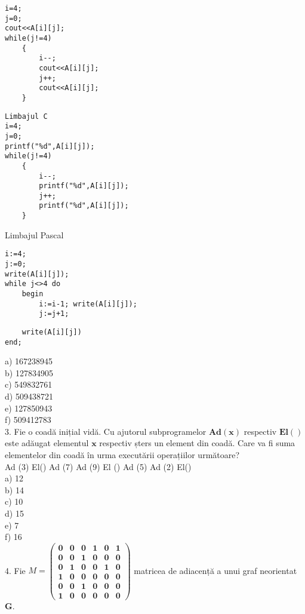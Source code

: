 \begin{verbatim}
i=4;
j=0;
cout<<A[i][j];
while(j!=4)
    {
        i--;
        cout<<A[i][j];
        j++;
        cout<<A[i][j];
    }
\end{verbatim}

\begin{verbatim}
Limbajul C
i=4;
j=0;
printf("%d",A[i][j]);
while(j!=4)
    {
        i--;
        printf("%d",A[i][j]);
        j++;
        printf("%d",A[i][j]);
    }
\end{verbatim}

Limbajul Pascal

\begin{verbatim}
i:=4;
j:=0;
write(A[i][j]);
while j<>4 do
    begin
        i:=i-1; write(A[i][j]);
        j:=j+1;
\end{verbatim}

\begin{verbatim}
    write(A[i][j])
end;
\end{verbatim}

a) 167238945\\
b) 127834905\\
c) 549832761\\
d) 509438721\\
e) 127850943\\
f) 509412783\\
3. Fie o coadă inițial vidă. Cu ajutorul subprogramelor $\mathbf{A d}(\mathbf{x})$ respectiv $\mathbf{E l}()$ este adăugat elementul $\mathbf{x}$ respectiv șters un element din coadă. Care va fi suma elementelor din coadă în urma executării operațiilor următoare?\\
Ad (3) El() Ad (7) Ad (9) El () Ad (5) Ad (2) El()\\
a) 12\\
b) 14\\
c) 10\\
d) 15\\
e) 7\\
f) 16\\
4. Fie $M=\left(\begin{array}{llllll}\mathbf{0} & \mathbf{0} & \mathbf{0} & \mathbf{1} & \mathbf{0} & \mathbf{1} \\ \mathbf{0} & \mathbf{0} & \mathbf{1} & \mathbf{0} & \mathbf{0} & \mathbf{0} \\ \mathbf{0} & \mathbf{1} & \mathbf{0} & \mathbf{0} & \mathbf{1} & \mathbf{0} \\ \mathbf{1} & \mathbf{0} & \mathbf{0} & \mathbf{0} & \mathbf{0} & \mathbf{0} \\ \mathbf{0} & \mathbf{0} & \mathbf{1} & \mathbf{0} & \mathbf{0} & \mathbf{0} \\ \mathbf{1} & \mathbf{0} & \mathbf{0} & \mathbf{0} & \mathbf{0} & \mathbf{0}\end{array}\right)$ matricea de adiacenṭă a unui graf neorientat $\mathbf{G}$.

